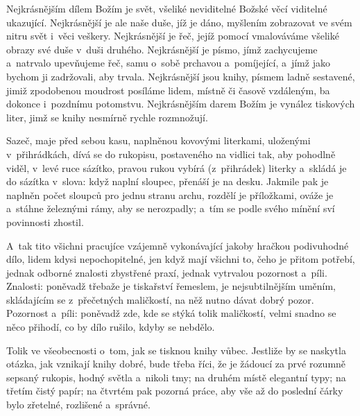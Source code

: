 Nejkrásnějším dílem Božím je svět, všeliké neviditelné Božské věcí viditelné
ukazující. Nejkrásnější je ale naše duše, jíž je dáno, myšlením zobrazovat
ve svém nitru svět i~věci veškery. Nejkrásnější je řeč, jejíž pomocí
vmalováváme všeliké obrazy své duše v~duši druhého. Nejkrásnější je písmo,
jímž zachycujeme a~natrvalo upevňujeme řeč, samu o~sobě prchavou
a~pomíjející, a~jímž jako bychom ji zadržovali, aby trvala. Nejkrásnější jsou
knihy, písmem ladně sestavené, jimiž zpodobenou moudrost posíláme lidem,
místně či časově vzdáleným, ba dokonce i~pozdnímu potomstvu. Nejkrásnějším
darem Božím je vynález tiskových liter, jimž se knihy nesmírně rychle
rozmnožují. 

Sazeč, maje před sebou kasu, naplněnou kovovými literkami, uloženými
v~přihrádkách, dívá se do rukopisu, postaveného na vidlici tak, aby pohodlně
viděl, v~levé ruce sázítko, pravou rukou vybírá (z~přihrádek) literky
a~skládá je do sázítka v~slova: když naplní sloupec, přenáší je na desku.
Jakmile pak je naplněn počet sloupců pro jednu stranu archu, rozdělí je
příložkami, ováže je a~stáhne železnými rámy, aby se nerozpadly; a~tím se
podle svého mínění sví povinnosti zhostil.

A~tak tito všichni pracujíce vzájemně vykonávající jakoby hračkou
podivuhodné dílo, lidem kdysi nepochopitelné, jen když mají všichni to, čeho
je přitom potřebí, jednak odborné znalosti zbystřené praxí, jednak vytrvalou
pozornost a~píli. Znalosti: poněvadž třebaže je tiskařství řemeslem, je
nejsubtilnějším uměním, skládajícím se z~přečetných maličkostí, na něž nutno
dávat dobrý pozor. Pozornost a~píli: poněvadž zde, kde se stýká tolik
maličkostí, velmi snadno se něco přihodí, co by dílo rušilo, kdyby se
nebdělo.

Tolik ve všeobecnosti o~tom, jak se tisknou knihy vůbec. Jestliže by se
naskytla otázka, jak vznikají knihy dobré, bude třeba říci, že je žádoucí za
prvé rozumně sepsaný rukopis, hodný světla a~nikoli tmy; na druhém místě
elegantní typy; na třetím čistý papír; na čtvrtém pak pozorná práce, aby vše
až do poslední čárky bylo zřetelné, rozlišené a~správné.
